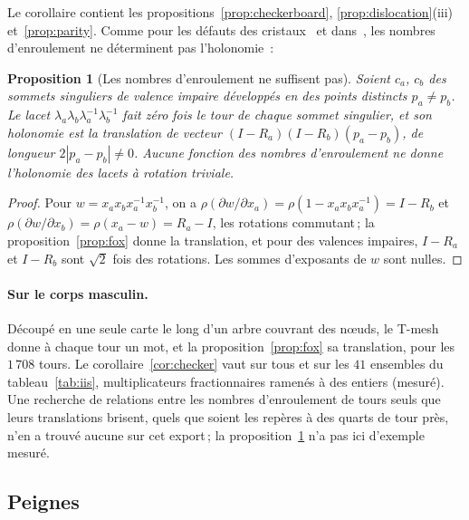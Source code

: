 \documentclass[11pt,a4paper]{article}
\newtheorem{proposition}{Proposition}
\newcommand{\lean}[1]{\texttt{\detokenize{#1}}}
\newenvironment{evidence}[3][]{}{}
\begin{document}
Le corollaire contient les propositions~\ref{prop:checkerboard},
\ref{prop:dislocation}(iii) et~\ref{prop:parity}. Comme pour les défauts des
cristaux~\cite{kleman2008disclinations} et
dans~\cite[\S7]{izmestiev2013torus}, les nombres d'enroulement ne déterminent
pas l'holonomie~:

\begin{evidence}{lean}{\lean{commutator_holonomy}, \lean{winding_numbers_do_not_suffice}}
\begin{proposition}[Les nombres d'enroulement ne suffisent pas]\label{prop:commutator}
Soient $c_a$, $c_b$ des sommets singuliers de valence impaire développés en
des points distincts $p_a \neq p_b$. Le lacet $\lambda_a \lambda_b
\lambda_a^{-1} \lambda_b^{-1}$ fait zéro fois le tour de chaque sommet
singulier, et son holonomie est la translation de vecteur $(I - R_a)(I -
R_b)(p_a - p_b)$, de longueur $2|p_a - p_b| \neq 0$. Aucune fonction des
nombres d'enroulement ne donne l'holonomie des lacets à rotation triviale.
\end{proposition}
\end{evidence}

\begin{proof}
Pour $w = x_a x_b x_a^{-1} x_b^{-1}$, on a $\rho(\partial w/\partial x_a) =
\rho(1 - x_a x_b x_a^{-1}) = I - R_b$ et $\rho(\partial w/\partial x_b) =
\rho(x_a - w) = R_a - I$, les rotations commutant\,; la
proposition~\ref{prop:fox} donne la translation, et pour des valences
impaires, $I - R_a$ et $I - R_b$ sont $\sqrt2$ fois des rotations. Les sommes
d'exposants de $w$ sont nulles.
\end{proof}

\paragraph{Sur le corps masculin.}
Découpé en une seule carte le long d'un arbre couvrant des nœuds, le T-mesh
donne à chaque tour un mot, et la proposition~\ref{prop:fox} sa translation,
pour les $1\,708$ tours. Le corollaire~\ref{cor:checker} vaut sur tous et sur
les $41$ ensembles du tableau~\ref{tab:iis}, multiplicateurs fractionnaires
ramenés à des entiers (mesuré). Une recherche de relations entre les nombres
d'enroulement de tours seuls que leurs translations brisent, quels que soient
les repères à des quarts de tour près, n'en a trouvé aucune sur cet
export\,; la proposition~\ref{prop:commutator} n'a pas ici d'exemple
mesuré.

\subsection{Peignes}\label{sec:combs}
\end{document}
